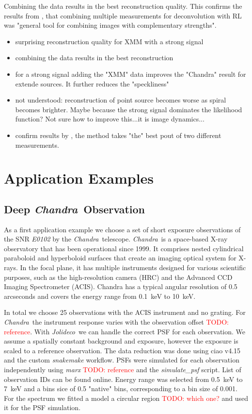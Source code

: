 \documentclass[twocolumn]{aastex631}
\newcommand{\chandra}{\textit{Chandra}~}
\newcommand{\jolideco}{\textit{Jolideco}~}
\newcommand{\todo}[1]{\textcolor{red}{TODO: #1}\PackageWarning{TODO:}{#1!}}
\begin{document}
    Combining the data results in the best reconstruction quality. This confirms the results from \cite{Ingaramo2014}, that combining multiple measurements for deconvolution with RL was "general tool for combining images with complementary strengths".

    \begin{itemize}
        \item surprising reconstruction quality for XMM with a strong signal
        \item combining the data results in the best reconstruction
        \item for a strong signal adding the "XMM" data improves the "Chandra" result for extende sources. It further reduces the "speckliness"
        \item not understood: reconstruction of point source becomes worse as spiral becomes brighter. Maybe because the strong signal dominates the likelihood function? Not sure how to improve this...it is image dynamics...
        \item confirm results by , the method takes "the" best pout of two different measurements. 
    \end{itemize}
    
    \section{Application Examples}
    \subsection{Deep \chandra Observation}
    As a first application example we choose a set of short exposure observations of the SNR \textit{E0102} by the \chandra telescope. \chandra is a space-based X-ray observatory that has been operational since 1999. It comprises nested cylindrical paraboloid and hyperboloid surfaces that create an imaging optical system for X-rays. In the focal plane, it has multiple instruments designed for various scientific purposes, such as the high-resolution camera (HRC) and the Advanced CCD Imaging Spectrometer (ACIS). Chandra has a typical angular resolution of 0.5 arcseconds and covers the energy range from \qty[mode = text]{0.1}{keV} to  \qty[mode = text]{10}{keV}. 
    
    In total we choose 25 observations with the ACIS instrument and no grating. For \chandra the instrument response varies with the observation offset \todo{reference}. With \jolideco we can handle the correct PSF for each observation. We assume a spatially constant background and exposure, however the exposure is scaled to a reference observation. The data reduction was done using ciao v4.15 and the custom \textit{snakemake} workflow. PSFs were simulated for each observation independently using \textit{marx} \todo{reference} and the \textit{simulate\_psf} script. List of observation IDs can be found online. Energy range was selected from \qty[mode = text]{0.5}{keV} to  \qty[mode = text]{7}{keV} and a bins sice of 0.5 "native" bins, corresponding to a bin size of \qty[mode = text]{0.001}{}. For the spectrum we fitted a model a circular region \todo{which one?} and used it for the PSF simulation. 
\end{document}
